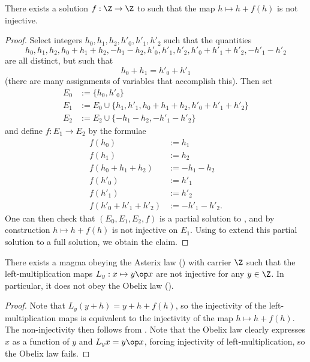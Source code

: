 \begin{corollary}\label{no-inject}  There exists a solution $f:\Z \to \Z$ to  such that the map $h \mapsto h + f(h)$ is not injective.
\end{corollary}

\begin{proof}  Select integers $h_0,h_1,h_2,h'_0,h'_1,h'_2$ such that the quantities
  $$ h_0, h_1, h_2, h_0+h_1+h_2, -h_1-h_2, h'_0, h'_1, h'_2, h'_0+h'_1+h'_2, -h'_1-h'_2$$
  are all distinct, but such that
  $$ h_0 + h_1 = h'_0 + h'_1$$
  (there are many assignments of variables that accomplish this).  Then set
\begin{align*}
  E_0 &:= \{h_0, h'_0\}\\
  E_1 &:= E_0 \cup \{ h_1, h'_1, h_0+h_1+h_2, h'_0+h'_1+h'_2\}\\
  E_2 &:= E_2 \cup \{ -h_1-h_2, -h'_1-h'_2\}
\end{align*}
and define $f: E_1 \to E_2$ by the formulae
\begin{align*}
  f(h_0) &:= h_1 \\
  f(h_1) &:= h_2 \\
  f(h_0+h_1+h_2) &:= -h_1-h_2 \\
  f(h'_0) &:= h'_1 \\
  f(h'_1) &:= h'_2 \\
  f(h'_0+h'_1+h'_2) &:= -h'_1-h'_2.
\end{align*}
One can then check that $(E_0, E_1, E_2, f)$ is a partial solution to , and by construction $h \mapsto h + f(h)$ is not injective on $E_1$.  Using  to extend this partial solution to a full solution, we obtain the claim.
\end{proof}

\begin{corollary}\label{asterix-obelix}  There exists a magma obeying the Asterix law () with carrier $\Z$ such that the left-multiplication maps $L_y: x \mapsto y \op x$ are not injective for any $y \in \Z$.  In particular, it does not obey the Obelix law ().
\end{corollary}

\begin{proof} Note that $L_y (y+h) = y + h + f(h)$, so the injectivity of the left-multiplication maps is equivalent to the injectivity of the map $h \mapsto h + f(h)$.  The non-injectivity then follows from . Note that the Obelix law clearly expresses $x$ as a function of $y$ and $L_y x = y \op x$, forcing injectivity of left-multiplication, so the Obelix law fails.
\end{proof}

